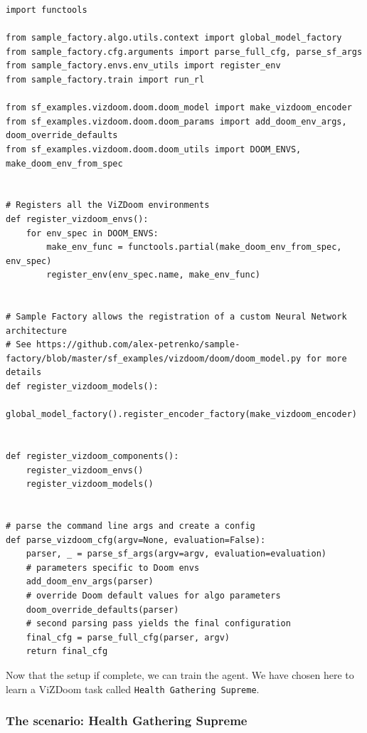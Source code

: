 \documentclass[11pt,a4paper]{article}
\begin{document}
\begin{lstlisting}
import functools

from sample_factory.algo.utils.context import global_model_factory
from sample_factory.cfg.arguments import parse_full_cfg, parse_sf_args
from sample_factory.envs.env_utils import register_env
from sample_factory.train import run_rl

from sf_examples.vizdoom.doom.doom_model import make_vizdoom_encoder
from sf_examples.vizdoom.doom.doom_params import add_doom_env_args, doom_override_defaults
from sf_examples.vizdoom.doom.doom_utils import DOOM_ENVS, make_doom_env_from_spec


# Registers all the ViZDoom environments
def register_vizdoom_envs():
    for env_spec in DOOM_ENVS:
        make_env_func = functools.partial(make_doom_env_from_spec, env_spec)
        register_env(env_spec.name, make_env_func)


# Sample Factory allows the registration of a custom Neural Network architecture
# See https://github.com/alex-petrenko/sample-factory/blob/master/sf_examples/vizdoom/doom/doom_model.py for more details
def register_vizdoom_models():
    global_model_factory().register_encoder_factory(make_vizdoom_encoder)


def register_vizdoom_components():
    register_vizdoom_envs()
    register_vizdoom_models()


# parse the command line args and create a config
def parse_vizdoom_cfg(argv=None, evaluation=False):
    parser, _ = parse_sf_args(argv=argv, evaluation=evaluation)
    # parameters specific to Doom envs
    add_doom_env_args(parser)
    # override Doom default values for algo parameters
    doom_override_defaults(parser)
    # second parsing pass yields the final configuration
    final_cfg = parse_full_cfg(parser, argv)
    return final_cfg
\end{lstlisting}

Now that the setup if complete, we can train the agent. We have chosen here to learn a ViZDoom task called \texttt{Health\ Gathering\ Supreme}.

\subsubsection{The scenario: Health Gathering Supreme}\label{the-scenario-health-gathering-supreme}

\end{document}
